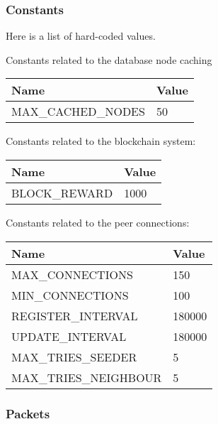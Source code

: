 \documentclass[../documentation.tex]{subfiles}
\begin{document}

%

\pagebreak

\subsubsection{Constants}

Here is a list of hard-coded values.

Constants related to the database node caching

\bgroup{}
\def\arraystretch{1.25}
\begin{tabular}{|l|l|}
    \hline
    \textbf{Name} & \textbf{Value}
    \\ \hline
    MAX\_CACHED\_NODES & 50
    \\ \hline
\end{tabular}
\egroup{}

Constants related to the blockchain system:

\bgroup{}
\def\arraystretch{1.25}
\begin{tabular}{|l|l|}
    \hline
    \textbf{Name} & \textbf{Value}
    \\ \hline
    BLOCK\_REWARD & 1000
    \\ \hline
\end{tabular}
\egroup{}

Constants related to the peer connections:

\bgroup{}
\def\arraystretch{1.25}
\begin{tabular}{|l|l|}
    \hline
    \textbf{Name} & \textbf{Value}
    \\ \hline
    MAX\_CONNECTIONS & 150
    \\ \hline
    MIN\_CONNECTIONS & 100
    \\ \hline
    REGISTER\_INTERVAL & 180000
    \\ \hline
    UPDATE\_INTERVAL & 180000
    \\ \hline
    MAX\_TRIES\_SEEDER & 5
    \\ \hline
    MAX\_TRIES\_NEIGHBOUR & 5
    \\ \hline
\end{tabular}
\egroup{}


\subsubsection{Packets}

\end{document}
